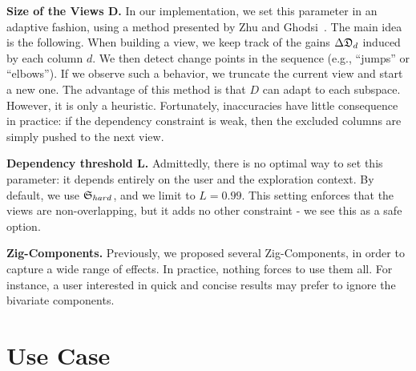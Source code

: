 \textbf{Size of the Views D.} In our implementation, we set this parameter in an adaptive
fashion, using a method presented by Zhu and Ghodsi~\cite{zhu2006automatic}.
The main idea is the following. When building a view, we keep track of the
gains $\Delta\mathfrak{D}_d$ induced by each column $d$.  We then detect change
points in the sequence (e.g., ``jumps'' or ``elbows'').  If we observe such a
behavior, we truncate the current view and start a new one.  The advantage of
this method is that $D$ can adapt to each subspace. However, it is
only a heuristic. Fortunately, inaccuracies have little consequence in
practice: if the dependency constraint is weak, then the excluded columns are
simply pushed to the next view.

\textbf{Dependency threshold L.} Admittedly, there is no optimal way to set
this parameter: it depends entirely on the user and the exploration context. By
default, we use $\mathfrak{S}_{hard}$, and we limit to $L=0.99$. This setting
enforces that the views are non-overlapping, but it adds no other constraint -
we see this as a safe option.

\textbf{Zig-Components.} Previously, we proposed several Zig-Components, in
order to capture a wide range of effects. In practice, nothing forces to use
them all. For instance, a user interested in quick and concise results may
prefer to ignore the bivariate components.


\section{Use Case}
\label{sec:usecase}

